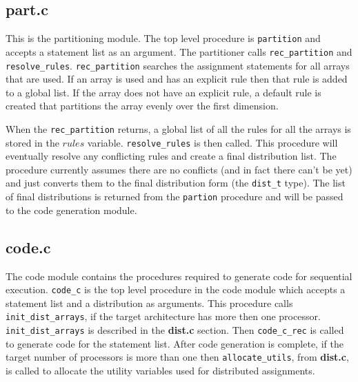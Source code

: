 \subsection{{\bf part.c}}
This is the partitioning module.  The top level procedure is {\tt partition}
and accepts a statement list as an argument.  The partitioner calls
{\tt rec\_partition} and {\tt resolve\_rules}.  {\tt rec\_partition} searches the
assignment statements for all arrays that are used.  If an array
is used and has an explicit rule then that rule is added to a global
list.  If the array does not have an explicit rule, a default rule
is created that partitions the array evenly over the first dimension.

When the {\tt rec\_partition} returns, a global list of all the rules for
all the arrays is stored in the $rules$ variable.  {\tt resolve\_rules}
is then called.  This procedure will eventually resolve any conflicting
rules and create a final distribution list.  The procedure currently assumes
there are no conflicts (and in fact there can't be yet) and just converts
them to the final distribution form (the {\tt dist\_t} type).  The list
of final distributions is returned from the {\tt partion} procedure and
will be passed to the code generation module.

\subsection{{\bf code.c}}
The code module contains the procedures required to generate code for 
sequential execution.  {\tt code\_c} is the top level procedure in
the code module which accepts a statement list and a distribution as
arguments.  This procedure calls {\tt init\_dist\_arrays}, if the target
architecture has more then one processor.  {\tt init\_dist\_arrays} is described in
the {\bf dist.c} section.  Then {\tt code\_c\_rec} is called to generate code for
the statement list.  After code generation is complete, if the target
number of processors is more than one then {\tt allocate\_utils}, from
{\bf dist.c}, is called to allocate the utility variables used for distributed
assignments.

